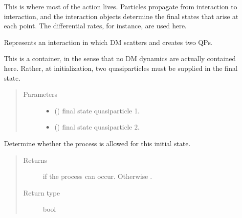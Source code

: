\documentclass[letterpaper,10pt,english]{sphinxmanual}
\begin{document}
This is where most of the action lives. Particles propagate from interaction
to interaction, and the interaction objects determine the final states that
arise at each point. The differential rates, for instance, are used here.

\begin{fulllineitems}
\label{\detokenize{code_structure:scdc.interaction.DarkMatterScatter}}
Represents an interaction in which DM scatters and creates two QPs.

This is a container, in the sense that no DM dynamics are actually
contained here. Rather, at initialization, two quasiparticles must be
supplied in the final state.
\begin{quote}\begin{description}
\item[{Parameters}] \leavevmode\begin{itemize}
\item {} 
 () \textendash{} final state quasiparticle 1.

\item {} 
 () \textendash{} final state quasiparticle 2.

\end{itemize}

\end{description}\end{quote}

\begin{fulllineitems}
\label{\detokenize{code_structure:scdc.interaction.DarkMatterScatter.allowed}}
Determine whether the process is allowed for this initial state.
\begin{quote}\begin{description}
\item[{Returns}] \leavevmode
{} if the process can occur. Otherwise .

\item[{Return type}] \leavevmode
bool

\end{description}\end{quote}

\end{fulllineitems}


\end{fulllineitems}
\end{document}
